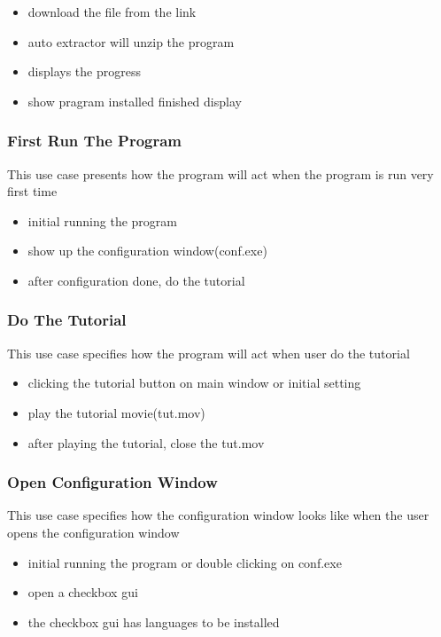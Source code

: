 \documentclass[conference]{IEEEtran}
\begin{document}
\begin{itemize}
  \item download the file from the link
  \item auto extractor will unzip the program
  \item displays the progress
  \item show pragram installed finished display
\end{itemize}
\textit{}



\subsubsection{First Run The Program}
This use case presents how the program will act when the program is run very first time
\begin{itemize}
  \item initial running the program
  \item show up the configuration window(conf.exe)
  \item after configuration done, do the tutorial
\end{itemize}
\textit{}



\subsubsection{Do The Tutorial}
This use case specifies how the program will act when user do the tutorial
\begin{itemize}
  \item clicking the tutorial button on main window or initial setting 
  \item play the tutorial movie(tut.mov)
  \item after playing the tutorial, close the tut.mov
\end{itemize}
\textit{}



\subsubsection{Open Configuration Window}
This use case specifies how the configuration window looks like when the user opens the configuration window
\begin{itemize}
  \item initial running the program or double clicking on conf.exe
  \item open a checkbox gui
  \item the checkbox gui has languages to be installed
\end{itemize}
\textit{}
\end{document}
